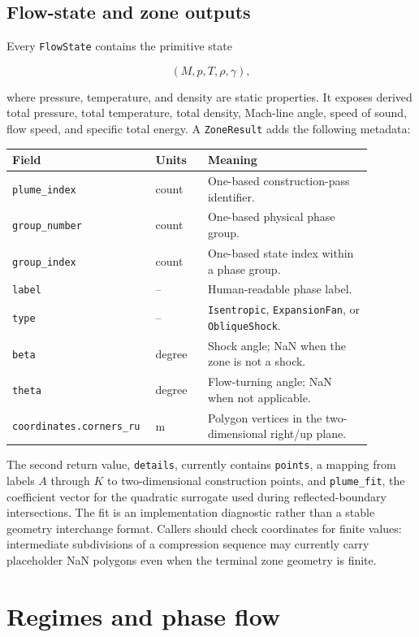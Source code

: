 \documentclass[11pt]{article}
\newcommand{\Mach}{\mathit{M}}
\begin{document}
\subsection{Flow-state and zone outputs}

Every \texttt{FlowState} contains the primitive state

\[
  (\Mach, p, T, \rho, \gamma),
\]

where pressure, temperature, and density are static properties.  It exposes
derived total pressure, total temperature, total density, Mach-line angle,
speed of sound, flow speed, and specific total energy.  A \texttt{ZoneResult}
adds the following metadata:

\begin{longtable}{p{0.30\linewidth}p{0.14\linewidth}p{0.44\linewidth}}
\hline
Field & Units & Meaning \\
\hline
\texttt{plume\_index} & count & One-based construction-pass identifier. \\
\texttt{group\_number} & count & One-based physical phase group. \\
\texttt{group\_index} & count & One-based state index within a phase group. \\
\texttt{label} & -- & Human-readable phase label. \\
\texttt{type} & -- & \texttt{Isentropic}, \texttt{ExpansionFan}, or \texttt{ObliqueShock}. \\
\texttt{beta} & degree & Shock angle; NaN when the zone is not a shock. \\
\texttt{theta} & degree & Flow-turning angle; NaN when not applicable. \\
\texttt{coordinates.corners\_ru} & m & Polygon vertices in the two-dimensional right/up plane. \\
\hline
\end{longtable}

The second return value, \texttt{details}, currently contains
\texttt{points}, a mapping from labels \(A\) through \(K\) to two-dimensional
construction points, and \texttt{plume\_fit}, the coefficient vector for the
quadratic surrogate used during reflected-boundary intersections.  The fit is
an implementation diagnostic rather than a stable geometry interchange
format.  Callers should check coordinates for finite values: intermediate
subdivisions of a compression sequence may currently carry placeholder NaN
polygons even when the terminal zone geometry is finite.

\section{Regimes and phase flow}
\end{document}
